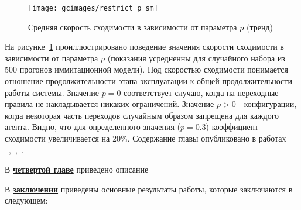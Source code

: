 \begin{figure}
    \centering
    \texttt{[image: gcimages/restrict\_p\_sm]}
    \caption{Средняя скорость сходимости в зависимости от параметра $p$ (тренд)}
    \label{fig:restrict_profit}
\end{figure}

На рисунке~\ref{fig:restrict_profit} проиллюстрировано поведение значения скорости сходимости в зависимости от параметра $p$ (показания усредненны для случайного набора из 500 прогонов иммитационной модели). Под скоростью сходимости понимается отношение продолжительности этапа эксплуатации к общей продолжительности работы системы. Значение $p = 0$ соответствует случаю, когда на переходные правила не накладывается никаких ограничений. Значение $p>0$ - конфигурации, когда некоторая часть переходов случайным образом запрещена для каждого агента. Видно, что для определенного значения ($p=0.3$) коэффициент сходимости увеличивается на $20\%$.
Содержание главы опубликовано в работах ~\cite{5G},~\cite{globecom},~\cite{ent-2017}.  




В \underline{\textbf{четвертой главе}} приведено описание


В \underline{\textbf{заключении}} приведены основные результаты работы, которые заключаются в следующем:




